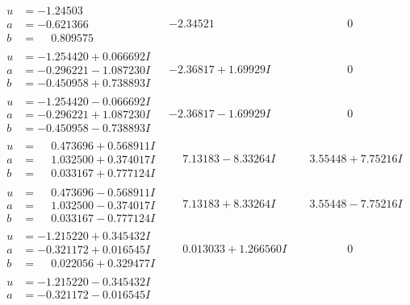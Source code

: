 \documentclass[1p]{elsarticle_modified}
\theoremstyle{definition}
\begin{document}
$$\begin{array}{c|c|c}
 \hline 
\begin{aligned}
u &= -1.24503\phantom{ +0.000000I} \\
a &= -0.621366\phantom{ +0.000000I} \\
b &= \phantom{-}0.809575\phantom{ +0.000000I}\end{aligned}
 & -2.34521\phantom{ +0.000000I} & \phantom{-0.000000 } 0 \\ \hline\begin{aligned}
u &= -1.254420 + 0.066692 I \\
a &= -0.296221 - 1.087230 I \\
b &= -0.450958 + 0.738893 I\end{aligned}
 & -2.36817 + 1.69929 I & \phantom{-0.000000 } 0 \\ \hline\begin{aligned}
u &= -1.254420 - 0.066692 I \\
a &= -0.296221 + 1.087230 I \\
b &= -0.450958 - 0.738893 I\end{aligned}
 & -2.36817 - 1.69929 I & \phantom{-0.000000 } 0 \\ \hline\begin{aligned}
u &= \phantom{-}0.473696 + 0.568911 I \\
a &= \phantom{-}1.032500 + 0.374017 I \\
b &= \phantom{-}0.033167 + 0.777124 I\end{aligned}
 & \phantom{-}7.13183 - 8.33264 I & \phantom{-}3.55448 + 7.75216 I \\ \hline\begin{aligned}
u &= \phantom{-}0.473696 - 0.568911 I \\
a &= \phantom{-}1.032500 - 0.374017 I \\
b &= \phantom{-}0.033167 - 0.777124 I\end{aligned}
 & \phantom{-}7.13183 + 8.33264 I & \phantom{-}3.55448 - 7.75216 I \\ \hline\begin{aligned}
u &= -1.215220 + 0.345432 I \\
a &= -0.321172 + 0.016545 I \\
b &= \phantom{-}0.022056 + 0.329477 I\end{aligned}
 & \phantom{-}0.013033 + 1.266560 I & \phantom{-0.000000 } 0 \\ \hline\begin{aligned}
u &= -1.215220 - 0.345432 I \\
a &= -0.321172 - 0.016545 I \\

\end{aligned}
\end{array}$$
\end{document}
